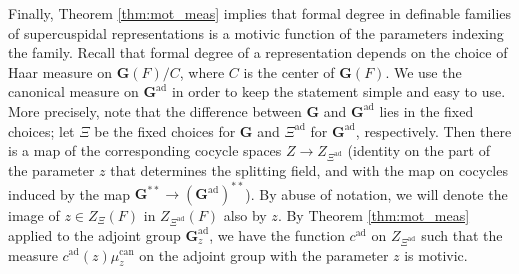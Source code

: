 \documentclass{amsart}
\newcommand{\bG}{\mathbf{G}}
\newcommand{\can}{\mathrm{can}}
\newcommand\ad{\mathrm{ad}}
\theoremstyle{plain}
\theoremstyle{definition}
\begin{document}
Finally, Theorem \ref{thm:mot_meas} implies that formal degree in definable families of
supercuspidal representations is a motivic function of the parameters indexing the family. 
Recall that formal degree of a representation depends on the choice of Haar measure on 
$\bG(F)/C$, where $C$ is the center of $\bG(F)$. 
We use the canonical measure on $\bG^\ad$ in order to keep the statement simple and easy to use. 
More precisely, note that the difference between $\bG$ and $\bG^\ad$ lies in the fixed choices; let $\Xi$ be the fixed choices for 
$\bG$ and  $\Xi^\ad$ for $\bG^{\ad}$,  respectively. 
Then there is a map of the corresponding cocycle spaces $Z\to Z_{\Xi^\ad}$ (identity on the part of the parameter $z$ that determines the splitting field, and with the map on  cocycles induced by
the map $\bG^{\ast\ast} \to (\bG^{\ad})^{\ast\ast}$). By abuse of notation, we will denote the image of $z\in Z_\Xi(F)$ in 
$Z_{\Xi^\ad}(F)$ also by $z$.  
By Theorem \ref{thm:mot_meas} applied to the adjoint group $\bG_z^{\ad}$, we have the function $c^\ad$ on $Z_{\Xi^\ad}$ such that the measure 
$c^\ad(z) \mu_z^{\can}$ on the adjoint group with the parameter $z$ is motivic. 
 
\end{document}
